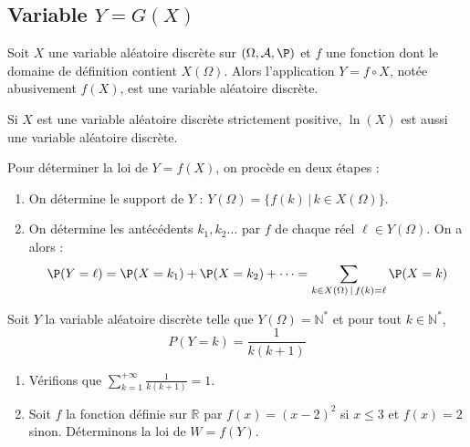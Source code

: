 \documentclass[french,11pt,twoside]{VcCours}
\begin{document}
\newpage

\phantom{test}

\vspace{7cm}
\subsection{Variable \texorpdfstring{$Y=G(X)$}{Y=G(X)}}
\begin{Proposition}{}
Soit $X$ une variable aléatoire discrète sur $(\Omega, \mathcal{A}, \P)$ et $f$ une fonction dont le domaine de définition contient $X(\Omega)$. Alors l'application $Y=f \circ X$, notée abusivement $f(X)$, est une variable aléatoire discrète.
\end{Proposition}

\begin{Exemple}{} Si $X$ est une variable aléatoire discrète strictement positive, $\ln(X)$ est aussi une variable aléatoire discrète.
\end{Exemple}

\medskip

\begin{Methode}{}
Pour déterminer la loi de $Y=f(X)$, on procède en deux étapes : 
\begin{enumerate}
\item On détermine le support de $Y$ : $Y(\Omega) = \lbrace f(k) \, \vert \, k \in X(\Omega) \rbrace.$
\item  On détermine les antécédents $k_1,k_2\dots$ par $f$ de chaque réel $ \ell \in Y(\Omega)$. On a alors :  \[ \P(Y=\ell)=\P(X=k_1)+\P(X=k_2)+\cdots = \sum_{k \in X(\Omega) \, \vert \, f(k)= \ell} \P(X=k) \]
\end{enumerate}
\end{Methode}


\begin{Exemple}{}\label{ex2.6}
Soit $Y$ la variable aléatoire discrète telle que $Y(\Omega) = \mathbb{N}^*$ et pour tout $k \in \mathbb{N}^*$,
\[ P(Y=k)= \frac{1}{k(k+1)} \]
\begin{enumerate}
\item Vérifions que $\sum_{k=1}^{+ \infty} \frac{1}{k(k+1)} = 1$.

\vspace{3cm}

\item Soit $f$ la fonction définie sur $\mathbb{R}$ par $f(x) = (x-2)^2$ si $x \leq 3$ et $f(x)=2$ sinon. Déterminons la loi de $W=f(Y)$.

\vspace{3cm}
\end{enumerate}
\end{Exemple}
\end{document}
